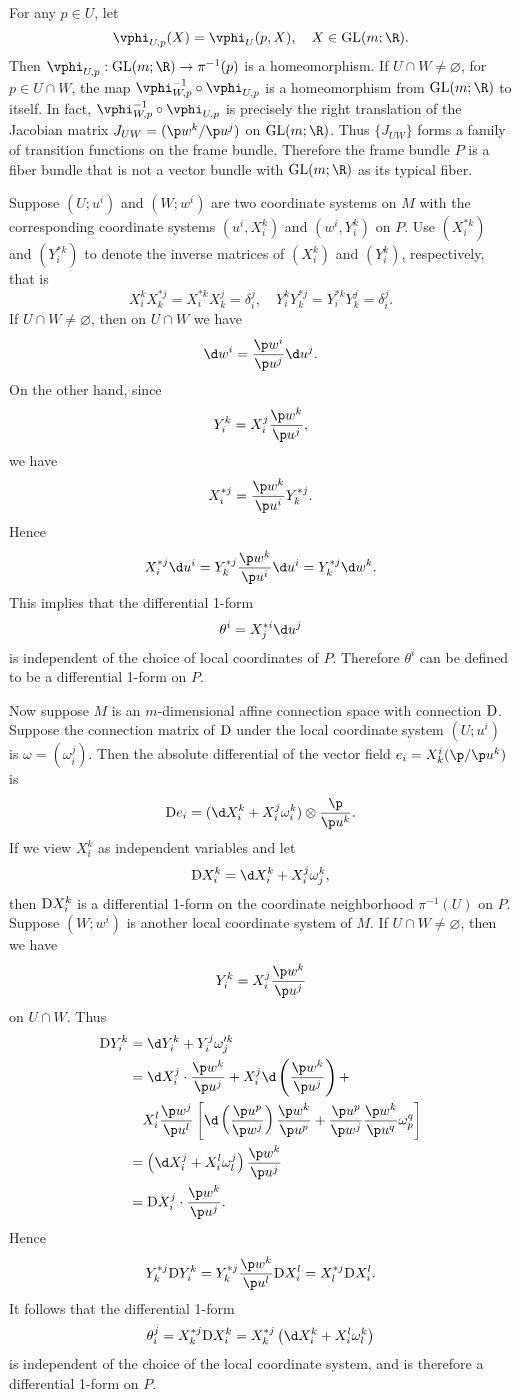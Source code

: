 \documentclass[11pt]{article}
\begin{document}
For any $p \in U$, let $$\vphi_{U, p}(X) = \vphi_U(p, X), \quad X \in \GL(m; \R).$$ Then $\vphi_{U, p} : \GL(m; \R) \rightarrow \pi^{-1}(p)$ is a homeomorphism. If $U \cap W \neq \varnothing$, for $p \in U \cap W$, the map $\vphi_{W, p}^{-1} \circ \vphi_{U, p}$ is a homeomorphism from $\GL(m; \R)$ to itself. In fact, $\vphi_{W, p}^{-1} \circ \vphi_{U, p}$ is precisely the right translation of the Jacobian matrix $J_{UW} = (\p w^k / \p u^j)$ on $\GL(m; \R)$. Thus $\{J_{UW}\}$ forms a family of transition functions on the frame bundle. Therefore the frame bundle $P$ is a fiber bundle that is not a vector bundle with $\GL(m; \R)$ as its typical fiber. 

Suppose $(U; u^i)$ and $(W; w^i)$ are two coordinate systems on $M$ with the corresponding coordinate systems $(u^i, X^k_i)$ and $(w^i, Y^k_i)$ on $P$. Use $(X^{*k}_i)$ and $(Y^{*k}_i)$ to denote the inverse matrices of $(X^k_i)$ and $(Y^k_i)$, respectively, that is $$X^k_iX^{*j}_k = X^{*k}_iX^j_k = \delta^j_i, \quad Y^k_iY^{*j}_k = Y^{*k}_iY^j_k = \delta^j_i.$$ If $U \cap W \neq \varnothing$, then on $U \cap W$ we have $$\d w^i = \frac{\p w^i}{\p u^j}\d u^j.$$ On the other hand, since $$Y^k_i = X^j_i\frac{\p w^k}{\p u^j},$$ we have $$X^{*j}_i = \frac{\p w^k}{\p u^i}Y^{*j}_k.$$ Hence $$X^{*j}_i\d u^i = Y^{*j}_k\frac{\p w^k}{\p u^i}\d u^i = Y^{*j}_k\d w^k.$$ This implies that the differential 1-form $$\theta^i = X^{*i}_j\d u^j$$ is independent of the choice of local coordinates of $P$. Therefore $\theta^i$ can be defined to be a differential 1-form on $P$. 

Now suppose $M$ is an $m$-dimensional affine connection space with connection $\text{D}$. Suppose the connection matrix of $\text{D}$ under the local coordinate system $(U; u^i)$ is $\omega = (\omega^j_i).$ Then the absolute differential of the vector field $e_i = X^i_k (\p / \p u^k)$ is $$\D e_i = (\d X^k_i + X^j_i\omega^k_i) \otimes \frac{\p}{\p u^k}.$$ If we view $X^k_i$ as independent variables and let $$\D X^k_i = \d X^k_i + X^j_i\omega^k_j,$$ then $\text{D} X^k_i$ is a differential 1-form on the coordinate neighborhood $\pi^{-1}(U)$ on $P$. Suppose $(W; w^i)$ is another local coordinate system of $M$. If $U \cap W \neq \varnothing$, then we have $$Y^k_i = X^j_i \frac{\p w^k}{\p u^j}$$ on $U \cap W$. Thus
\begin{align*}
    \D Y^k_i &= \d Y^k_i + Y^j_i\omega'^k_j \\
    &= \d X^j_i \cdot \frac{\p w^k}{\p u^j} + X^j_i\d\left(\frac{\p w^k}{\p u^j}\right) + \\
    & \quad X^l_i \frac{\p w^j}{\p u^l}\left[\d\left(\frac{\p u^p}{\p w^j}\right)\frac{\p w^k}{\p u^p} + \frac{\p u^p}{\p w^j}\frac{\p w^k}{\p u^q}\omega^q_p\right] \\
    &= \left(\d X^j_i + X^l_i\omega^j_l\right)\frac{\p w^k}{\p u^j} \\
    &= \D X^j_i \cdot \frac{\p w^k}{\p u^j}.
\end{align*}
Hence $$Y^{*j}_k\D Y^k_i = Y^{*j}_k \frac{\p w^k}{\p u^l} \D X^l_i = X^{*j}_l \D X^l_i.$$ It follows that the differential 1-form $$\theta^j_i = X^{*j}_k\D X^k_i = X^{*j}_k\left(\d X^k_i + X^l_i \omega^k_l\right)$$ is independent of the choice of the local coordinate system, and is therefore a differential 1-form on $P$. 
\end{document}
